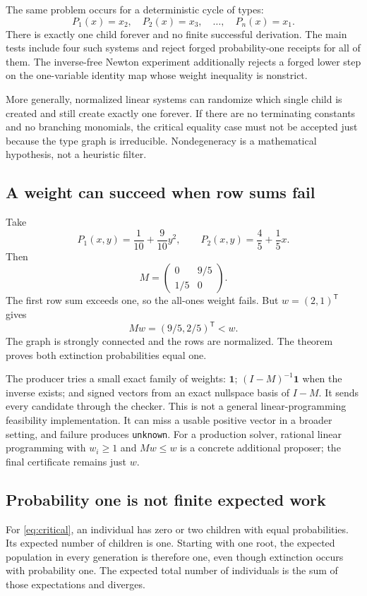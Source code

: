 \documentclass[11pt,a4paper]{article}
\theoremstyle{definition}\newtheorem{definition}[theorem]{Definition}
\theoremstyle{remark}\newtheorem{remark}[theorem]{Remark}
\newcommand{\one}{\mathbf 1}\newcommand{\zero}{\mathbf 0}
\newcommand{\code}[1]{\nolinkurl{#1}}
\begin{document}
The same problem occurs for a deterministic cycle of types:
\[
 P_1(x)=x_2,\quad P_2(x)=x_3,\quad\ldots,\quad P_n(x)=x_1.
\]
There is exactly one child forever and no finite successful derivation. The main tests include four such systems and reject forged probability-one receipts for all of them. The inverse-free Newton experiment additionally rejects a forged lower step on the one-variable identity map whose weight inequality is nonstrict.

More generally, normalized linear systems can randomize which single child is created and still create exactly one forever. If there are no terminating constants and no branching monomials, the critical equality case must not be accepted just because the type graph is irreducible. Nondegeneracy is a mathematical hypothesis, not a heuristic filter.

\subsection{A weight can succeed when row sums fail}
Take
\[
 P_1(x,y)=\frac1{10}+\frac9{10}y^2,
 \qquad
 P_2(x,y)=\frac45+\frac15x.
\]
Then
\[
 M=\begin{pmatrix}0&9/5\\1/5&0\end{pmatrix}.
\]
The first row sum exceeds one, so the all-ones weight fails. But $w=(2,1)^{\mathsf T}$ gives
\[
 Mw=(9/5,2/5)^{\mathsf T}<w.
\]
The graph is strongly connected and the rows are normalized. The theorem proves both extinction probabilities equal one.

The producer tries a small exact family of weights: $\one$; $(I-M)^{-1}\one$ when the inverse exists; and signed vectors from an exact nullspace basis of $I-M$. It sends every candidate through the checker. This is not a general linear-programming feasibility implementation. It can miss a usable positive vector in a broader setting, and failure produces \code{unknown}. For a production solver, rational linear programming with $w_i\ge1$ and $Mw\le w$ is a concrete additional proposer; the final certificate remains just $w$.

\subsection{Probability one is not finite expected work}
For \eqref{eq:critical}, an individual has zero or two children with equal probabilities. Its expected number of children is one. Starting with one root, the expected population in every generation is therefore one, even though extinction occurs with probability one. The expected total number of individuals is the sum of those expectations and diverges.
\end{document}
